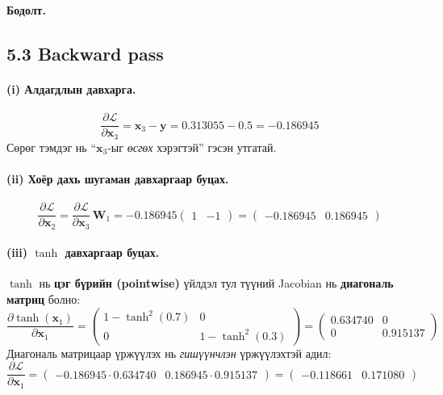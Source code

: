 \documentclass[11pt]{article}
\newenvironment{solution}[1][\textbf{Бодолт.}]
    { \noindent #1 \smallskip \\ }
    { \medskip }
\newcommand{\dL}[1]{\frac{\partial \mathcal{L}}{\partial #1}}
\begin{document}
\begin{solution}
\subsection*{5.3 Backward pass}
\paragraph{(i) Алдагдлын давхарга.}
\begin{equation}
\dL{\mathbf{x}_3} = \mathbf{x}_3 - \mathbf{y} = 0.313055 - 0.5 = \mathbf{-0.186945}
\end{equation}
Сөрөг тэмдэг нь ``$\mathbf{x}_3$-ыг \emph{өсгөх} хэрэгтэй'' гэсэн утгатай.

\paragraph{(ii) Хоёр дахь шугаман давхаргаар буцах.}
\begin{equation}
\dL{\mathbf{x}_2} = \dL{\mathbf{x}_3}\,\mathbf{W}_1
= -0.186945\begin{pmatrix} 1 & -1 \end{pmatrix}
= \begin{pmatrix} -0.186945 & 0.186945 \end{pmatrix}
\end{equation}

\paragraph{(iii) $\tanh$ давхаргаар буцах.}
$\tanh$ нь \textbf{цэг бүрийн (pointwise)} үйлдэл тул түүний Jacobian нь
\textbf{диагональ матриц} болно:
\[
\frac{\partial \tanh(\mathbf{x}_1)}{\partial \mathbf{x}_1} =
\begin{pmatrix} 1-\tanh^2(0.7) & 0 \\ 0 & 1-\tanh^2(0.3) \end{pmatrix}
= \begin{pmatrix} 0.634740 & 0 \\ 0 & 0.915137 \end{pmatrix}
\]
Диагональ матрицаар үржүүлэх нь \emph{гишүүнчлэн} үржүүлэхтэй адил:
\begin{equation}
\dL{\mathbf{x}_1}
= \begin{pmatrix} -0.186945\cdot 0.634740 & 0.186945\cdot 0.915137 \end{pmatrix}
= \begin{pmatrix} \mathbf{-0.118661} & \mathbf{0.171080} \end{pmatrix}
\end{equation}


\end{solution}
\end{document}
